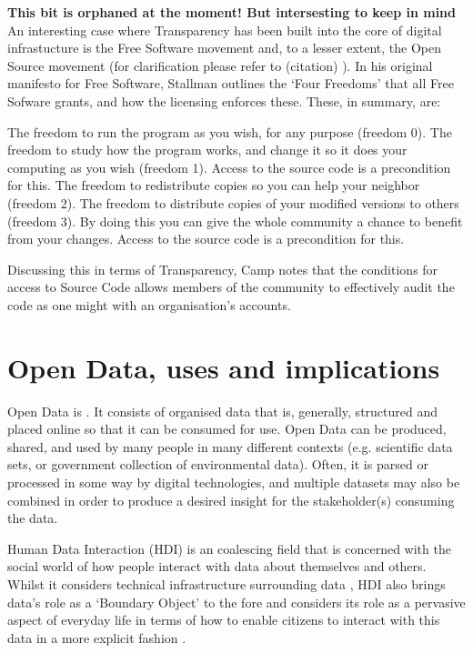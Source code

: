\textbf{This bit is orphaned at the moment! But intersesting to keep in mind}
An interesting case where Transparency has been built into the core of digital infrastucture is the Free Software movement and, to a lesser extent, the Open Source movement (for clarification please refer to (citation) ). In his original manifesto for Free Software, Stallman outlines the `Four Freedoms' that all Free Sofware grants, and how the licensing enforces these. These, in summary, are:

        The freedom to run the program as you wish, for any purpose (freedom 0).
        The freedom to study how the program works, and change it so it does your computing as you wish (freedom 1). Access to the source code is a precondition for this.
        The freedom to redistribute copies so you can help your neighbor (freedom 2).
        The freedom to distribute copies of your modified versions to others (freedom 3). By doing this you can give the whole community a chance to benefit from your changes. Access to the source code is a precondition for this.

Discussing this in terms of Transparency, Camp notes that the conditions for access to Source Code allows members of the community to effectively audit the code as one might with an organisation's accounts.

\section{Open Data, uses and implications}

Open Data is  \cite{open_data_institute_what_nodate}. It consists of organised data that is, generally, structured and placed online so that it can be consumed for use. Open Data can be produced, shared, and used by many people in many different contexts (e.g. scientific data sets, or government collection of environmental data). Often, it is parsed or processed in some way by digital technologies, and multiple datasets may also be combined in order to produce a desired insight for the stakeholder(s) consuming the data.

Human Data Interaction (HDI) is an coalescing field that is concerned with the social world of how people interact with data about themselves and others. Whilst it considers technical infrastructure surrounding data \cite{mcauley_dataware_2011}, HDI also brings data's role as a `Boundary Object' \cite{star_institutional_1989} to the fore and considers its role as a pervasive aspect of everyday life in terms of how to enable citizens to interact with this data in a more explicit fashion \cite{mortier_human-data_2014}.

